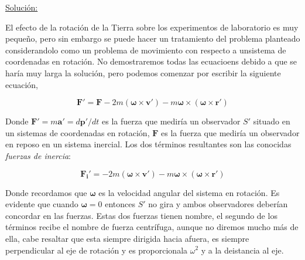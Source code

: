 \documentclass[a4paper,10pt]{article}
\numberwithin{equation}{section}
\begin{document}
\underline{Solución:}

\vspace{.3cm}

El efecto de la rotación de la Tierra sobre los experimentos de laboratorio es muy pequeño, pero sin embargo se puede
hacer un tratamiento del problema planteado considerandolo como un problema de movimiento con respecto
a unsistema de coordenadas en rotación. No demostraremos todas las ecuacioens debido a que se haría
muy larga la solución, pero podemos comenzar por escribir la siguiente ecuación,

\begin{equation}
 \mathbf{F'} = \mathbf{F} - 2m(\mathbf{\omega} \times \mathbf{v'}) - m\mathbf{\omega} \times (\mathbf{\omega} \times \mathbf{r'})
 \label{eq:FuerzasDeSistemaRotacion}
\end{equation}

Donde $\mathbf{F'} = m\mathbf{a'} = d\mathbf{p'}/dt$ es la fuerza que mediría un observador $S'$ situado
en un sistemas de coordenadas en rotación, $\mathbf{F}$ es la fuerza que mediría un observador
en reposo en un sistema inercial. Los dos términos resultantes son las conocidas \emph{fuerzas de inercia}:

\begin{equation}
 \mathbf{F_i'} = - 2m(\mathbf{\omega} \times \mathbf{v'}) - m\mathbf{\omega} \times (\mathbf{\omega} \times \mathbf{r'})
 \label{eq:FuerzasDeInercia}
\end{equation}

Donde recordamos que $\mathbf{\omega}$ es la velocidad angular del sistema en rotación. Es evidente que cuando $\mathbf{\omega} = 0$
entonces $S'$ no gira y ambos observadores deberían concordar en las fuerzas. Estas dos fuerzas tienen nombre, el segundo de los términos
recibe el nombre de fuerza centrífuga, aunque no diremos mucho más de ella, cabe resaltar que esta siempre dirigida hacia
afuera, es siempre perpendicular al eje de rotación y es proporcionala $\omega^2$ y a la deistancia al eje.

\vspace{.3cm}
\end{document}
